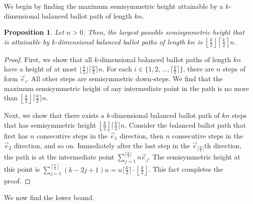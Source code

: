 \documentclass[11pt]{article}
\newtheorem{proposition}[theorem]{Proposition}
\newtheorem{remark}[theorem]{Remark}
\theoremstyle{remark}
\theoremstyle{definition}
\begin{document}
We begin by finding the maximum semisymmetric height attainable by a $k$-dimensional balanced ballot path of length $kn$.

\begin{proposition}\label{prop:maxheight}
Let $n > 0$. Then, the largest possible semisymmetric height that is attainable by $k$-dimensional balanced ballot paths of length $kn$ is $\left\lfloor \frac{k}{2}\right\rfloor \left\lceil \frac{k}{2} \right\rceil n$.
\end{proposition}
\begin{proof}
First, we show that all $k$-dimensional balanced ballot paths of length $kn$ have a height of at most $\lfloor \frac{k}{2}\rfloor \lceil \frac{k}{2} \rceil n$. For each $i \in \{1,2, \dots, \lceil \frac{k}{2}\rceil\}$, there are $n$ steps of form $\vec{e}_i$. All other steps are semisymmetric down-steps. We find that the maximum semisymmetric height of any intermediate point in the path is no more than $\left \lfloor \frac{k}{2}\right\rfloor \lceil \frac{k}{2} \rceil n$.

Next, we show that there exists a $k$-dimensional balanced ballot path of $kn$ steps that has semisymmetric height $\left\lfloor \frac{k}{2} \right\rfloor \lceil \frac{k}{2} \rceil n$. Consider the balanced ballot path that first has $n$ consecutive steps in the $\vec{e}_1$ direction, then $n$ consecutive steps in the $\vec{e}_2$ direction, and so on. Immediately after the last step in the $\vec{e}_{\lceil \frac{k}{2} \rceil}$th direction, the path is at the intermediate point $\sum_{j=1}^{\lceil \frac{k}{2} \rceil}n \vec{e}_j$. The semisymmetric height at this point is $\sum_{j=1}^{\left\lceil \frac{k}{2}\right\rceil} (k-2j+1)n = n \lceil \frac{k}{2} \rceil \cdot \left\lfloor \frac{k}{2} \right\rfloor$. This fact completes the proof.\end{proof}

We now find the lower bound.
\end{document}
